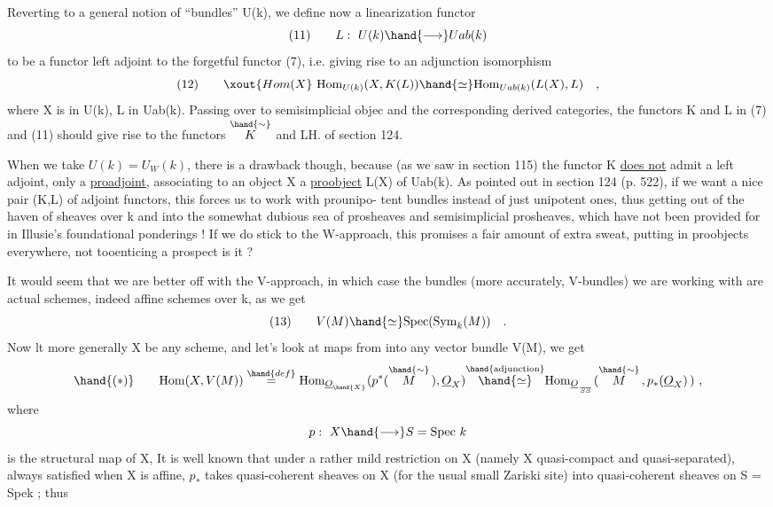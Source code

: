 
Reverting to a general notion of ``bundles'' U(k),  we define now a
linearization functor
\[ (11) \qquad L:\ U(k) \hand{\longrightarrow} Uab(k) \]
to be a functor left adjoint to the forgetful functor (7),  i.e. giving
rise to an adjunction isomorphism
\[ (12) \qquad \xout{Hom(X} \ \mathrm{Hom}_{U(k)}(X, K(L)) \hand{\simeq} \mathrm{Hom}_{Uab(k)}(L(X), L) \quad , \]
where X is in U(k),  L in Uab(k).  Passing over to semisimplicial objec
and the corresponding derived categories,  the functors K and L in
(7) and (11) should give rise to the functors $\overset{\hand{\sim}}{K}$ and LH.  of section
124.

When we take  $U(k) = U_W(k)$,  there is a drawback though,  because
(as we saw in section 115) the functor K \uline{does not} admit a left adjoint,
only a \uline{proadjoint},  associating to an object X a \uline{proobject} L(X) of
Uab(k).  As pointed out in section 124 (p. 522),  if we want a nice
pair (K,L) of adjoint functors,  this forces us to work with prounipo-%
tent bundles instead of just unipotent ones,  thus getting out of the
haven of sheaves over k and into the somewhat dubious sea of prosheaves
and semisimplicial prosheaves,  which have not been provided for in
Illusie's foundational ponderings !  If we do stick to the W-approach,
this promises   a fair amount of extra sweat,  putting in proobjects
everywhere,  not tooenticing a prospect is it ?

It would seem that we are better off with the V-approach,  in which
case the  bundles (more accurately, V-bundles) we are working 
with are actual schemes,  indeed affine schemes over k,  as we get
\[ (13) \qquad V(M) \hand{\simeq} \mathrm{Spec}(\mathrm{Sym}_k(M)) \quad . \]
Now lt more generally X be any scheme,  and let's look at maps from
 into any vector bundle V(M),  we get
\[ \hand{(*)} \qquad \mathrm{Hom}(X,V(M)) \overset{\hand{def}}{=} \mathrm{Hom}_{\underline{O}_{\hand{X}}}(p^*(\overset{\hand{\sim}}{M}\,), \underline{O}_X) \overset{\hand{\text{adjunction}}}{\hand{\simeq}} \mathrm{Hom}_{\underline{O}_{\over{S}{S}}}(\overset{\hand{\sim}}{M}\,, p_*(\underline{O}_X)\,)\ , \]
where
\[ p:\ X \hand{\longrightarrow} S = \mathrm{Spec}\ k \]
is the structural map of X, It is well known that under a rather mild
restriction on X (namely X  quasi-compact and quasi-separated),
always satisfied when X is affine,  $p_*$ takes quasi-coherent sheaves on
X (for the usual small Zariski site) into quasi-coherent sheaves on
S = Spek ;  thus 


